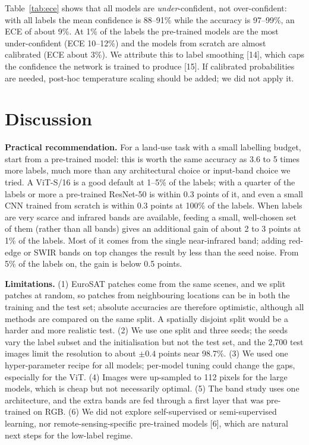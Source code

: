 \documentclass[twoside,a4paper,11pt]{article}
\begin{document}


Table~\ref{tab:ece} shows that all models are \emph{under}-confident, not over-confident:
with all labels the mean confidence is 88--91\% while the accuracy is 97--99\%, an ECE of about 9\%.
At 1\% of the labels the pre-trained models are the most under-confident (ECE 10--12\%) and the
models from scratch are almost calibrated (ECE about 3\%). We attribute this to label smoothing
[14], which caps the confidence the network is trained to produce [15]. If calibrated probabilities are needed,
post-hoc temperature scaling should be added; we did not apply it.

\section{Discussion}

\textbf{Practical recommendation.} For a land-use task with a small labelling budget, start from a pre-trained
model: this is worth the same accuracy as 3.6 to 5 times more labels, much more than any architectural choice or
input-band choice we tried. A ViT-S/16 is a good default at 1--5\% of the labels; with a quarter of the labels or more a pre-trained
ResNet-50 is within 0.3 points of it, and even a small CNN trained from scratch is within 0.3 points
at 100\% of the labels. When labels are very scarce and infrared bands are available, feeding a small, well-chosen
set of them (rather than all bands) gives an additional gain of about 2 to 3 points at 1\% of the labels. Most of it
comes from the single near-infrared band; adding red-edge or SWIR bands on top changes the result by less than the seed noise.
From 5\% of the labels on, the gain is below 0.5 points.

\textbf{Limitations.} (1) EuroSAT patches come from the same scenes, and we split patches at random,
so patches from neighbouring locations can be in both the training and the test set; absolute accuracies are
therefore optimistic, although all methods are compared on the same split. A spatially disjoint split would
be a harder and more realistic test. (2) We use one split and three seeds; the seeds vary the label
subset and the initialisation but not the test set, and the 2,700 test images limit the resolution to
about $\pm0.4$ points near 98.7\%. (3) We used one hyper-parameter recipe for all models; per-model tuning could change
the gaps, especially for the ViT. (4) Images were up-sampled to 112 pixels for the large models, which is
cheap but not necessarily optimal. (5) The band study uses one architecture, and the extra bands are fed through
a first layer that was pre-trained on RGB. (6) We did not explore self-supervised or semi-supervised
learning, nor remote-sensing-specific pre-trained models [6], which are natural next steps for the low-label regime.
\end{document}
